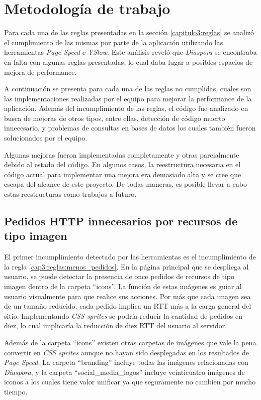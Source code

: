 \section{Metodología de trabajo}

Para cada una de las reglas presentadas en la sección \ref{capitulo3:reglas} se analizó el cumplimiento de las mismas por parte de la aplicación utilizando las herramientas 
\emph{Page Speed} e \emph{YSlow}. Este análisis reveló que \emph{Diaspora} se encontraba en falta con algunas reglas presentadas, lo cual daba lugar a posibles espacios de 
mejora de performance.

A continuación se presenta para cada una de las reglas no cumplidas, cuales son las implementaciones realizadas por el equipo para mejorar la performance de la aplicación.
Además del incumplimiento de las reglas, el código fue analizado en busca de mejoras de otros tipos, entre ellas, detección de código muerto innecesario, y problemas de consultas
en bases de datos los cuales también fueron solucionados por el equipo.

Algunas mejoras fueron implementadas completamente y otras parcialmente debido al estado del código. En algunos casos, la reestructura necesaria en el código actual para
implementar una mejora era demasiado alta y se cree que escapa del alcance de este proyecto. De todas maneras, es posible llevar a cabo estas reestructuras como trabajos a futuro. 

\subsection{Pedidos HTTP innecesarios por recursos de tipo imagen}

El primer incumplimiento detectado por las herramientas es el incumplimiento de la regla \ref{cap3:reglas:menos_pedidos}.
En la página principal que se despliega al usuario, se puede detectar la presencia de once pedidos de recursos de tipo imagen dentro de la carpeta ``icons''. La función de estas 
imágenes es guiar al usuario visualmente para que realice sus acciones. Por más que cada imagen sea de un tamaño reducido, cada pedido implica un RTT más a la carga general
del sitio. Implementando \emph{CSS sprites} se podría reducir la cantidad de pedidos en diez, lo cual implicaría la reducción de diez RTT del usuario al servidor.

Además de la carpeta ``icons'' existen otras carpetas de imágenes que vale la pena convertir en \emph{CSS sprites} aunque no hayan sido desplegadas en los resultados de
\emph{Page Speed}. La carpeta ``branding'' incluye todas las imágenes relacionadas con \emph{Diaspora}, y la carpeta ``social\_media\_logos'' incluye veinticuatro imágenes de 
iconos a los cuales tiene valor unificar ya que seguramente no cambien por mucho tiempo.

